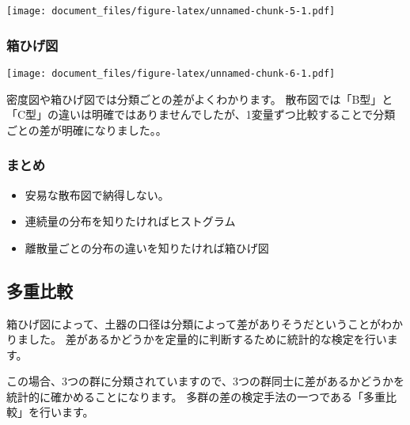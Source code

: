 \documentclass[]{article}
\newenvironment{Shaded}{\begin{snugshade}}{\end{snugshade}}
\newcommand{\DataTypeTok}[1]{\textcolor[rgb]{0.13,0.29,0.53}{#1}}
\newcommand{\KeywordTok}[1]{\textcolor[rgb]{0.13,0.29,0.53}{\textbf{#1}}}
\newcommand{\NormalTok}[1]{#1}
\newcommand{\OperatorTok}[1]{\textcolor[rgb]{0.81,0.36,0.00}{\textbf{#1}}}
\newcommand{\StringTok}[1]{\textcolor[rgb]{0.31,0.60,0.02}{#1}}
\providecommand{\tightlist}{%
  \setlength{\itemsep}{0pt}\setlength{\parskip}{0pt}}
\begin{document}
\texttt{[image: document\_files/figure-latex/unnamed-chunk-5-1.pdf]}

\subsubsection{箱ひげ図}

\begin{Shaded}
\end{Shaded}

\texttt{[image: document\_files/figure-latex/unnamed-chunk-6-1.pdf]}

密度図や箱ひげ図では分類ごとの差がよくわかります。
散布図では「B型」と「C型」の違いは明確ではありませんでしたが、1変量ずつ比較することで分類ごとの差が明確になりました。。

\subsubsection{まとめ}

\begin{itemize}
\tightlist
\item
  安易な散布図で納得しない。
\item
  連続量の分布を知りたければヒストグラム
\item
  離散量ごとの分布の違いを知りたければ箱ひげ図
\end{itemize}

\subsection{多重比較}

箱ひげ図によって、土器の口径は分類によって差がありそうだということがわかりました。
差があるかどうかを定量的に判断するために統計的な検定を行います。

この場合、3つの群に分類されていますので、3つの群同士に差があるかどうかを統計的に確かめることになります。
多群の差の検定手法の一つである「多重比較」を行います。
\end{document}
